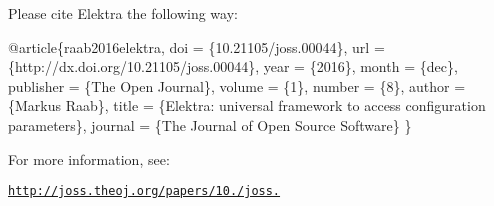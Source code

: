 Please cite Elektra the following way\+:


\begin{DoxyCode}
@article\{raab2016elektra,
        doi = \{10.21105/joss.00044\},
        url = \{http://dx.doi.org/10.21105/joss.00044\},
        year  = \{2016\},
        month = \{dec\},
        publisher = \{The Open Journal\},
        volume = \{1\},
        number = \{8\},
        author = \{Markus Raab\},
        title = \{Elektra: universal framework to access configuration parameters\},
        journal = \{The Journal of Open Source Software\}
\}
\end{DoxyCode}


For more information, see\+:

\href{http://joss.theoj.org/papers/10.21105/joss.00044}{\tt http\+://joss.\+theoj.\+org/papers/10./joss.} 